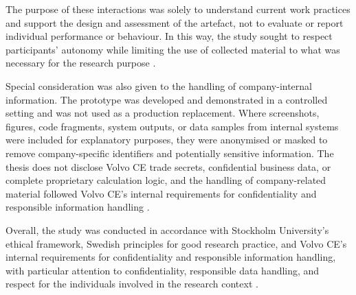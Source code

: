The purpose of these interactions was solely to understand current work practices and support the design and assessment of the artefact, not to evaluate or report individual performance or behaviour. In this way, the study sought to respect participants' autonomy while limiting the use of collected material to what was necessary for the research purpose \cite{vr_good_research_2024}.

Special consideration was also given to the handling of company-internal information. The prototype was developed and demonstrated in a controlled setting and was not used as a production replacement. Where screenshots, figures, code fragments, system outputs, or data samples from internal systems were included for explanatory purposes, they were anonymised or masked to remove company-specific identifiers and potentially sensitive information. The thesis does not disclose Volvo CE trade secrets, confidential business data, or complete proprietary calculation logic, and the handling of company-related material followed Volvo CE's internal requirements for confidentiality and responsible information handling \cite{su_ethics_policy}.

Overall, the study was conducted in accordance with Stockholm University's ethical framework, Swedish principles for good research practice, and Volvo CE's internal requirements for confidentiality and responsible information handling, with particular attention to confidentiality, responsible data handling, and respect for the individuals involved in the research context \cite{vr_good_research_2024}.


























